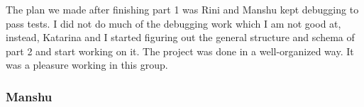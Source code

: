\documentclass[letterpaper,11pt]{article}
\begin{document}
    \noindent The plan we made after finishing part 1 was Rini and Manshu kept debugging to pass tests. I did not do much of the debugging work which I am not good at, instead, Katarina and I started figuring out the general structure and schema of part 2 and start working on it. The project was done in a well-organized way. It was a pleasure working in this group.
    \subsubsection{Manshu}




\end{document}
